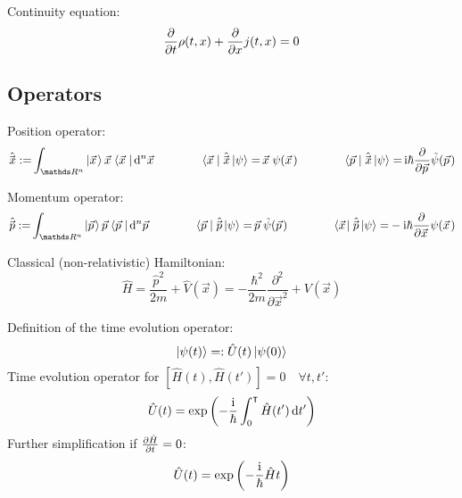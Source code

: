 			\noindent
			Continuity equation:
			\begin{equation}
				\pdv{t}\rho(t,x) + \pdv{x}j(t,x) = 0
			\end{equation}

	\subsection{Operators}
		\noindent
		Position operator:
		\begin{equation}
			\begin{aligned}
				\hat{\vec{x}} :=& \int_{\reals ^n} \Ket{\vec{x}} \vec{x} \Bra{\vec{x}\,}\dd[n]{\vec{x}} &\hsp
				\Bra{\vec{x}\,}\hat{\vec{x}}\Ket{\psi} =& \,\vec{x}\, \psi(\vec{x}) &\hsp
				\Bra{\vec{p}\,}\hat{\vec{x}}\Ket{\psi} =& \,\i\hbar\pdv{\vec{p}}\tilde{\psi}(\vec{p}) \\
			\end{aligned}
		\end{equation}

		\noindent
		Momentum operator:
		\begin{equation}
			\begin{aligned}
				\hat{\vec{p}} :=& \int_{\reals ^n} \Ket{\vec{p}} \vec{p} \Bra{\vec{p}\,}\dd^n\vec{p} &\hsp
				\Bra{\vec{p}\,}\hat{\vec{p}}\Ket{\psi} =& \,\vec{p}\, \tilde{\psi}(\vec{p}) &\hsp
				\Bra{\vec{x}}\hat{\vec{p}}\Ket{\psi} =& -\i\hbar\pdv{\vec{x}} \psi(\vec{x}) \\
			\end{aligned}
		\end{equation}

		\noindent
		Classical (non-relativistic) Hamiltonian:
		\begin{equation}
			\hat{H} = \frac{\hat{p}^2}{2m}+\hat{V}(\vec{x}) = -\frac{\hbar^2}{2m}\frac{\partial^2}{\partial \vec{x}^2} + V(\vec{x})
		\end{equation}

		\noindent
		Definition of the time evolution operator:
		\begin{equation}
			\Ket{\psi(t)} =: \hat{U}(t)\Ket{\psi(0)}
		\end{equation}
		Time evolution operator for $\left[\hat{H}(t),\hat{H}(t')\right] = 0\quad\forall t,t'$:
		\begin{equation}
			\hat{U}(t) = \exp\qty(-\frac{\mathrm{i}}{\hbar}\int_0^\intercal \hat{H}(t')\dd{t'})
		\end{equation}
		Further simplification if $\pdv{\hat{H}}{t}=0$:
		\begin{equation}
			\hat{U}(t) = \exp\qty(-\frac{\mathrm{i}}{\hbar}\hat{H} t)
		\end{equation}

